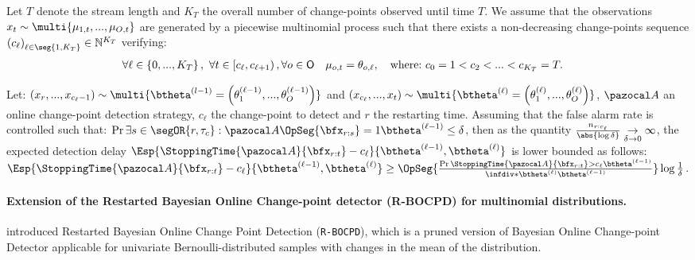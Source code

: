\documentclass{article} %
\begin{document}
\begin{definition}
	Let $T$ denote the stream length and $K_T$ the overall number of change-points observed until time $T$.
	We assume that the observations $x_t \sim \multi{\mu_{1,t},..., \mu_{O,t}}$ are generated by a piecewise multinomial process such that there exists a non-decreasing change-points sequence $\left( c_\ell  \right)_{\ell \in \seg{1,K_T} } \in \mathbb{N}^{K_T}$ verifying:
	\vspace{-1mm}\noindent
	\begin{align}
	\forall  \ell \in  \left\lbrace 0,...,K_T \right\rbrace, \  \forall  t \in \left[ c_\ell, c_{\ell+1} \right), \forall o \in {\mathsf{O}} \quad  \mu_{o,t} = \theta_{o,\ell} ,
	\quad \text{where:} \
	c_0 = 1 < c_2 <...<c_{K_T} = T. &  
	\label{PwSBEnv}
	\end{align}
\end{definition}


\begin{theorem}
Let: $\left( x_r,...,x_{c_\ell-1} \right) \sim \multi{\btheta^{(l-1)} = \left(\theta^{(\ell-1)}_1,..., \theta^{(\ell-1)}_O \right)}$ and $\left(x_{c_\ell},...,x_{t}\right) \sim \multi{\btheta^{(\ell)} = \left(\theta^{(\ell)}_1,..., \theta^{(\ell)}_O\right) }$, $\pA$ an online change-point detection strategy, $c_\ell$ the change-point to detect and $r$ the restarting time.
Assuming that the false alarm rate is controlled such that: $\Pr{\exists s \in \segOR{r,\tau_c}: \pA \OpSeg{\bfx_{r:s}}=1}{\btheta^{(\ell-1)}} \leq \delta$, then as the quantity $\frac{n_{r:c_\ell}}{\abs{\log \delta}} \underset{\delta \rightarrow 0}{\rightarrow} \infty$, 
the expected detection delay $\Esp{\StoppingTime{\pA}{\bfx_{r:t}} - c_\ell}{\btheta^{(\ell-1)},\btheta^{(\ell)}}$ is lower bounded as follows: 
$
\Esp{\StoppingTime{\pA}{\bfx_{r:t}} - c_\ell}{\btheta^{(\ell-1)},\btheta^{(\ell)}} \geq  \OpSeg{\frac{\Pr{\StoppingTime{\pA}{\bfx_{r:t}} > c_\ell}{\btheta^{(\ell-1)}}}{\infdiv*{\btheta^{(\ell)}}{\btheta^{(\ell-1)}}}} \log \frac{1}{\delta}$.
\label{Theorem::LowerBoundDetectionDelay}
\end{theorem}


\paragraph{Extension of the Restarted Bayesian Online Change-point detector (R-BOCPD) for multinomial distributions.} 


\cite{alami20a} introduced Restarted Bayesian Online Change Point Detection (\texttt{R-BOCPD}),
which is a pruned version of Bayesian Online Change-point Detector applicable for univariate Bernoulli-distributed samples
with changes in the mean of the distribution.
\end{document}
